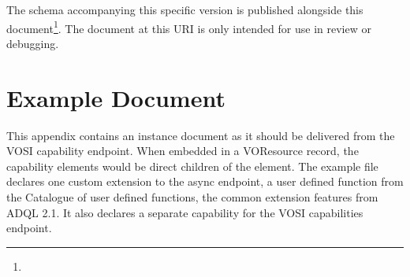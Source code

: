 \documentclass{ivoa}
\begin{document}
The schema accompanying this specific version is published alongside this
document\footnote{}.  The document at
this URI is only intended for use in review or debugging.

\section{Example Document}

\label{app:example}

This appendix contains an instance document as it should be 
delivered from the VOSI capability endpoint. When embedded in a
VOResource record, the capability elements would be direct children of
the  element.  The example file declares one custom
extension to the async endpoint, a user defined function from the
Catalogue of user defined functions, the common extension features from
ADQL 2.1.  It also declares a separate capability for the VOSI
capabilities endpoint.
\end{document}
